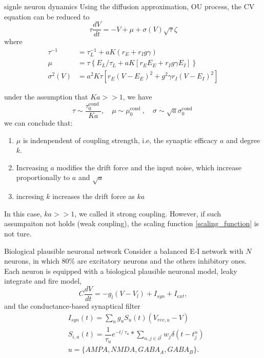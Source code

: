 \documentclass{beamer}
\begin{document}
\begin{frame}{signle neuron dynamics}
	Using the diffusion approximation, OU process, the CV equation can be reduced to
	\begin{equation}
		\tau \frac{d V}{d t}=-V+\mu+\sigma(V) \sqrt{\tau} \zeta
	\end{equation}
	where
	\begin{equation}
		\begin{aligned}
			\tau^{-1} &=\tau_{L}^{-1}+a K\left(r_{E}+r_{I} g \gamma\right) \\
			\mu &=\tau\left\{E_{L} / \tau_{L}+a K\left[r_{E} E_{E}+r_{I} g \gamma E_{I}\right]\right\} \\
			\sigma^{2}(V) &=a^{2} K \tau\left[r_{E}\left(V-E_{E}\right)^{2}+g^{2} \gamma r_{I}\left(V-E_{I}\right)^{2}\right]
		\end{aligned}
	\end{equation}
\end{frame}
\begin{frame}
	under the assumption that $Ka >> 1$, we have
	\begin{equation}\label{scaling_function}
		\tau \sim \frac{\tau_{0}^{\text {cond }}}{K a}, \quad \mu \sim \mu_{0}^{\text {cond }}, \quad \sigma \sim \sqrt{a} \sigma_{0}^{\text {cond }}
	\end{equation}
	we can conclude that:
	\begin{enumerate}
		\item $\mu$ is indenpendent of coupling strength, i.e, the synaptic efficacy $a$ and degree $k$.
		\item Increasing $a$ modifies the drift force and the input noise, which increase proportionally to $a$ and $\sqrt{a}$
		\item incresing $k$ increases the drift force as $ka$
	\end{enumerate}
	In this case, $ka >> 1$, we called it strong coupling. However, if such assumpaiton not holds (weak coupling), the scaling function \eqref{scaling_function} is not ture.
\end{frame}

\begin{frame}{Biological plausible neuronal network}
	Consider a balanced E-I network with $ N $ neurons, in which $ 80\% $  are excitatory neurons and the others inhibitory ones. Each neuron is equipped with a biological plausible neuronal model, leaky integrate and fire model, 
	\begin{equation*}
		C \dfrac{dV}{dt} = -g_{l}(V - V_{l}) + I_{syn} + I_{ext},
	\end{equation*}
	and the conductance-based synaptical filter
	\begin{equation*}
		\begin{aligned}
			&I_{syn}(t) = \sum_{u} g_{u} S_{u}(t)(V_{rev, u} - V)\\
			&S_{i, u}(t) = \dfrac{1}{\tau_{u}}e^{-t /\ \tau_{u}} \ast \sum_{n, j \in \partial ^{i}} w_{j} \delta \left(t - t_{j}^{n}\right)\\
			&u=\{AMPA, NMDA, GABA_{A}, GABA_{B}\}.
		\end{aligned}
	\end{equation*}
\end{frame}
\end{document}
